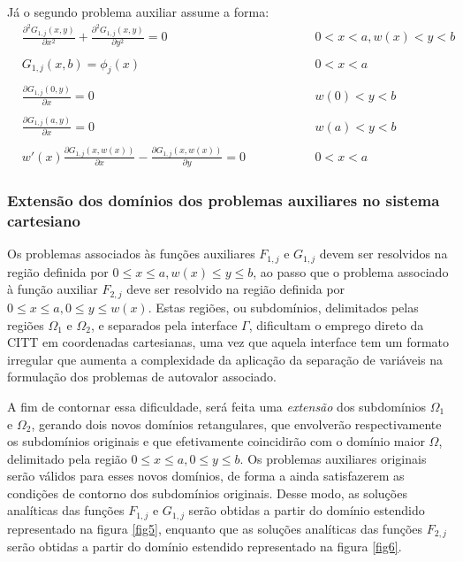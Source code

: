 Já o segundo problema auxiliar assume a forma:
\begin{subequations}
	\begin{alignat}{2}
	& \frac{\partial^2 G_{1,j}(x, y)}{\partial x^2} + \frac{\partial^2 G_{1,j}(x, y)}{\partial y^2} = 0 \quad\quad && 0 < x < a, w(x) < y < b \label{funcao_G_harm_T1_cart} \\ \nonumber \\
	& G_{1,j}(x, b) = \phi_j(x) && 0 < x < a  \label{funcao_G_cc_T1_2_cart} \\ \nonumber \\
	& \frac{\partial G_{1,j}(0, y)}{\partial x} = 0 && w(0) < y < b \label{funcao_G_cc_T1_1a_cart} \\ \nonumber \\
	& \frac{\partial G_{1,j}(a, y)}{\partial x} = 0 && w(a) < y < b \label{funcao_G_cc_T1_1b_cart} \\ \nonumber \\
	& w'(x)\frac{\partial G_{1,j}(x, w(x))}{\partial x} - \frac{\partial G_{1,j}(x, w(x))}{\partial y} = 0 \quad\quad\quad\quad && 0 < x < a \label{funcao_G_cc_grad_T1_cart}
	\end{alignat}
\end{subequations}

\subsubsection{Extensão dos domínios dos problemas auxiliares no sistema cartesiano}\label{secao_formulacao_aux}

Os problemas associados às funções auxiliares $F_{1,j}$ e $G_{1,j}$ devem ser resolvidos na região definida por $0 \le x \le a, w(x) \le y \le b$, ao passo que o problema associado à função auxiliar $F_{2,j}$ deve ser resolvido na região definida por $0 \le x \le a, 0 \le y \le w(x)$. Estas regiões, ou subdomínios, delimitados pelas regiões $\Omega_1$ e $\Omega_2$, e separados pela interface $\Gamma$, dificultam o emprego direto da CITT em coordenadas
cartesianas, uma vez que aquela interface tem um formato irregular que aumenta a complexidade da aplicação da separação de variáveis na formulação dos problemas
de autovalor associado.

A fim de contornar essa dificuldade, será feita uma \textit{extensão} dos subdomínios $\Omega_1$ e $\Omega_2$, gerando dois novos domínios retangulares,
que envolverão respectivamente os subdomínios originais e que efetivamente coincidirão com o domínio maior $\Omega$, delimitado pela região $0 \le x \le a, 0 \le y \le b$. Os problemas auxiliares originais serão válidos para esses novos domínios, de forma a ainda
satisfazerem as condições de contorno dos subdomínios originais.
Desse modo, as soluções analíticas das funções $F_{1, j}$ e $G_{1, j}$ serão obtidas a partir do domínio estendido representado na figura \ref{fig5}, enquanto que
as soluções analíticas das funções $F_{2, j}$ serão obtidas a partir do domínio estendido representado na figura \ref{fig6}.

